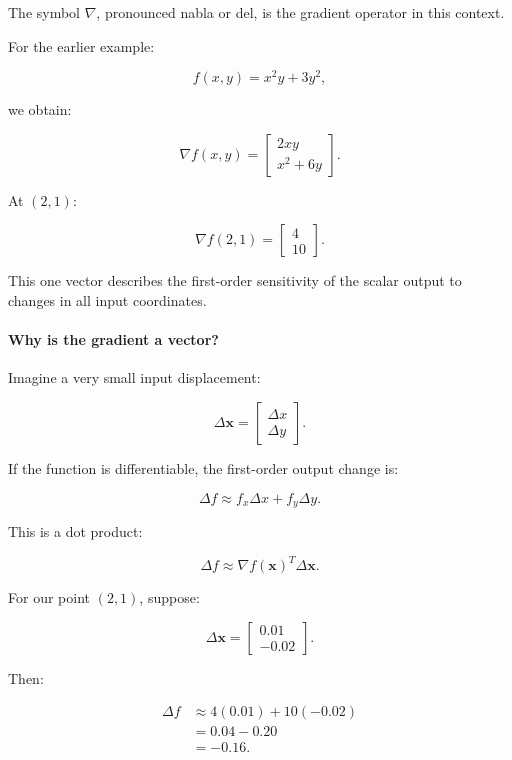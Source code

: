 The symbol \(\nabla\), pronounced nabla or del, is the gradient operator in this context.

For the earlier example:

\[
f(x,y)=x^2y+3y^2,
\]

we obtain:

\[
\nabla f(x,y)= \begin{bmatrix} 2xy\\ x^2+6y \end{bmatrix}.
\]

At \((2,1)\):

\[
\nabla f(2,1)= \begin{bmatrix}4\\10\end{bmatrix}.
\]

This one vector describes the first-order sensitivity of the scalar output to changes in all input coordinates.

\paragraph{Why is the gradient a vector?}\label{02-foundations-ii-ch021-why-is-the-gradient-a-vector}

\hypertarget{02-foundations-ii-ch021-why-is-the-gradient-a-vector}{}

Imagine a very small input displacement:

\[
\Delta\mathbf x= \begin{bmatrix} \Delta x\\ \Delta y \end{bmatrix}.
\]

If the function is differentiable, the first-order output change is:

\[
\Delta f \approx f_x\Delta x+f_y\Delta y.
\]

This is a dot product:

\[
\boxed{ \Delta f\approx\nabla f(\mathbf x)^T\Delta\mathbf x }.
\]

For our point \((2,1)\), suppose:

\[
\Delta\mathbf x= \begin{bmatrix} 0.01\\ -0.02 \end{bmatrix}.
\]

Then:

\[
\begin{aligned} \Delta f &\approx4(0.01)+10(-0.02)\\ &=0.04-0.20\\ &=-0.16. \end{aligned}
\]


